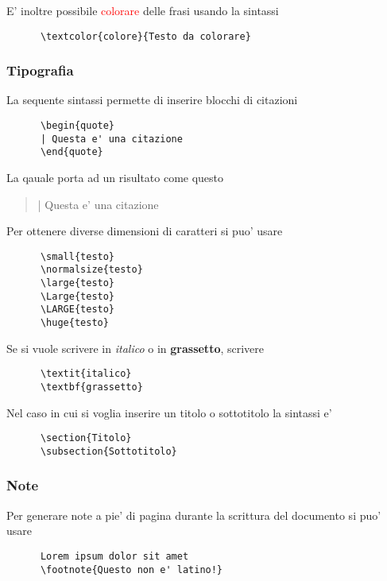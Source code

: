 \documentclass{article}
\begin{document}
{    E' inoltre possibile \textcolor{red}{colorare} delle frasi usando la sintassi
    \begin{verbatim}
      \textcolor{colore}{Testo da colorare}
    \end{verbatim}

    \subsubsection{Tipografia}
    La sequente sintassi permette di inserire blocchi di citazioni
    \begin{verbatim}
      \begin{quote}
      | Questa e' una citazione
      \end{quote}
    \end{verbatim}

    La qauale porta ad un risultato come questo
    \begin{quote}
      | Questa e' una citazione
    \end{quote}

    Per ottenere diverse dimensioni di caratteri si puo' usare
    \begin{verbatim}
      \small{testo}
      \normalsize{testo}
      \large{testo}
      \Large{testo}
      \LARGE{testo}
      \huge{testo}
    \end{verbatim}

    Se si vuole scrivere in \textit{italico} o in \textbf{grassetto}, scrivere
    \begin{verbatim}
      \textit{italico}
      \textbf{grassetto}
    \end{verbatim}

    Nel caso in cui si voglia inserire un titolo o sottotitolo la sintassi e'
    \begin{verbatim}
      \section{Titolo}
      \subsection{Sottotitolo}
    \end{verbatim}

    \subsubsection{Note}
    Per generare note a pie' di pagina durante la scrittura del documento si puo' usare
    \begin{verbatim}
      Lorem ipsum dolor sit amet
      \footnote{Questo non e' latino!}
    \end{verbatim}
  }
\end{document}
